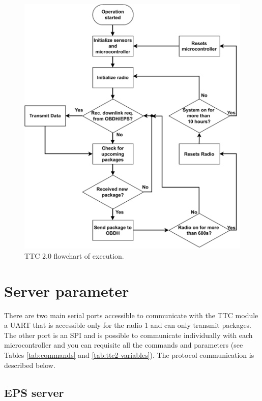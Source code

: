 \begin{figure}[!ht]
    \begin{center}
        \includegraphics[width=\textwidth]{figures/ttc2-flowchart.pdf}
        \caption{TTC 2.0 flowchart of execution.}
        \label{fig:ttc_flowchart}
    \end{center}
\end{figure}

\section{Server parameter}\label{sec:server_param}

There are two main serial ports accessible to communicate with the TTC module a UART that is accessible only for the radio 1 and can only transmit packages. The other port is an SPI and is possible to communicate individually with each microcontroller and you can requisite all the commands and parameters (see Tables \ref{tab:commands} and \ref{tab:ttc2-variables}). The protocol communication is described below.

\subsection{EPS server}

